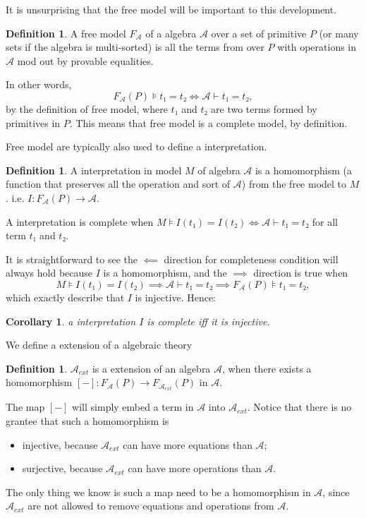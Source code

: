 \documentclass{article}
\theoremstyle{plain}
\newtheorem{corollary}[theorem]{Corollary}
\theoremstyle{definition}
\newtheorem{definition}[theorem]{Definition}
\theoremstyle{remark}
\begin{document}
It is unsurprising that the free model will be important to this development.
\begin{definition}
    A free model \(F_𝒜\) of a algebra \(𝒜\) over 
    a set of primitive \(P\) (or many sets if the algebra is multi-sorted)
    is all the terms from over \(P\) with operations in \(𝒜\) 
    mod out by provable equalities.
\end{definition} 
In other words, 
\[F_𝒜(P) ⊧ t₁ = t₂ \iff 𝒜 ⊢ t₁ = t₂,\]
by the definition of free model,
where \(t₁\) and \(t₂\) are two terms formed by primitives in \(P\).
This means that free model is a complete model, by definition.

Free model are typically also used to define a interpretation.
\begin{definition}
    A interpretation in model \(M\) of algebra \(𝒜\) is a 
    homomorphism (a function that preserves all the operation and sort of \(𝒜\))
    from the free model to \(M\). i.e. \(I: F_𝒜(P) → 𝒜\).

    A interpretation is complete when \(M ⊧ I(t₁) = I(t₂) \iff 𝒜 ⊢ t₁ = t₂\)
    for all term \(t₁\) and \(t₂\).
\end{definition}

It is straightforward to see the \(\impliedby\) direction 
for completeness condition will always hold 
because \(I\) is a homomorphism,
and the \(\implies\) direction is true 
when \[M ⊧ I(t₁) = I(t₂) \implies 𝒜 ⊢ t₁ = t₂ \implies F_𝒜(P) ⊧ t₁ = t₂,\]
which exactly describe that \(I\) is injective.
Hence:
\begin{corollary}
    a interpretation \(I\) is complete iff it is injective.
\end{corollary}

We define a extension of a algebraic theory 
\begin{definition}
    \(𝒜_{ext}\) is a extension of an algebra \(𝒜\),
    when there exists a homomorphism \([-]: F_{𝒜}(P) → F_{𝒜_{ext}}(P)\) in \(𝒜\).
\end{definition}
The map \([-]\) will simply embed a term in \(𝒜\) into \(𝒜_{ext}\).
Notice that there is no grantee that such a homomorphism is 
\begin{itemize}
    \item injective, because \(𝒜_{ext}\) can have more equations than \(𝒜\);
    \item surjective, because \(𝒜_{ext}\) can have more operations than \(𝒜\).
\end{itemize}
The only thing we know is such a map need to be a homomorphism in \(𝒜\),
since \(𝒜_{ext}\) are not allowed to remove equations and operations from \(𝒜\).
\end{document}
